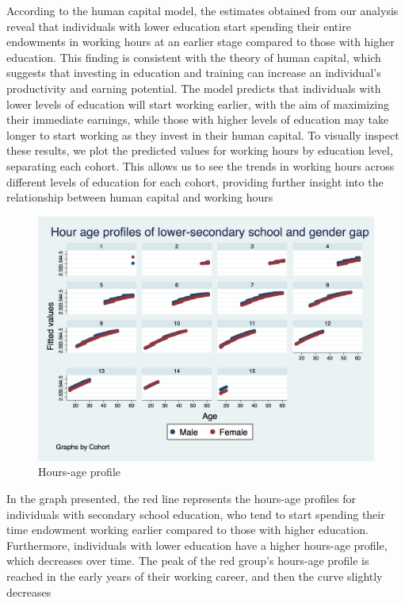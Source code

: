\documentclass[14pt]{sistedes}
\begin{document}
According to the human capital model, the estimates obtained from our analysis reveal that individuals with lower
education start spending their entire endowments in working hours at an earlier stage compared to those with higher
education. This finding is consistent with the theory of human capital, which suggests that investing in education and
training can increase an individual's productivity and earning potential. The model predicts that individuals with lower
levels of education will start working earlier, with the aim of maximizing their immediate earnings, while those with
higher levels of education may take longer to start working as they invest in their human capital.
\newline
To visually inspect these results, we plot the predicted values for working hours by education level, separating each
cohort. This allows us to see the trends in working hours across different levels of education for each cohort,
providing further insight into the relationship between human capital and working hours
\begin{figure}
    \centering
    \includegraphics[scale=0.3]{graph5.png}
    \caption{Hours-age profile}
    \label{fig:l_cohorts}
\end{figure}
In the graph presented, the red line represents the hours-age profiles for individuals with secondary school education,
 who tend to start spending their time endowment working earlier compared to those with higher education. Furthermore,
 individuals with lower education have a higher hours-age profile, which decreases over time. The peak of the red
 group's hours-age profile is reached in the early years of their working career, and then the curve slightly decreases
\end{document}
